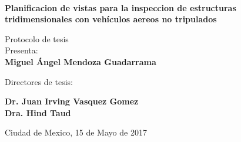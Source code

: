 \documentclass[letter]{letter}
\begin{document}
	\begin{minipage}[c][0.8\textheight][c]{0.2\textwidth}
		\begin{center}
			\hskip2pt
			\vrule width2.5pt height17cm 
			\hskip1mm
			\vrule width1pt height17cm \\     	
			\end{center}
	\end{minipage}
	\begin{minipage}[c][0.6\textheight][c]{0.65\textwidth}
	\begin{center}
	
	{\Large \textbf{Planificacion de vistas para la inspeccion de estructuras tridimensionales con vehículos aereos no tripulados}}
	\vspace{1cm}
	
	{\large {Protocolo de tesis}}\\[40pt]            
	Presenta:\\[5pt]
	\textbf{{Miguel \'Angel Mendoza Guadarrama}}
	
	\vspace{1cm}
	
	{\small Directores de tesis:}
	
	{\large \textbf{Dr. Juan Irving Vasquez Gomez }}\\
	{\large \textbf{Dra. Hind Taud }}

	\vspace{1cm}
	



	\vspace{1cm}

	{Ciudad de Mexico,}{ }{15 de Mayo de 2017}
	\end{center}
	\end{minipage}
\end{document}

